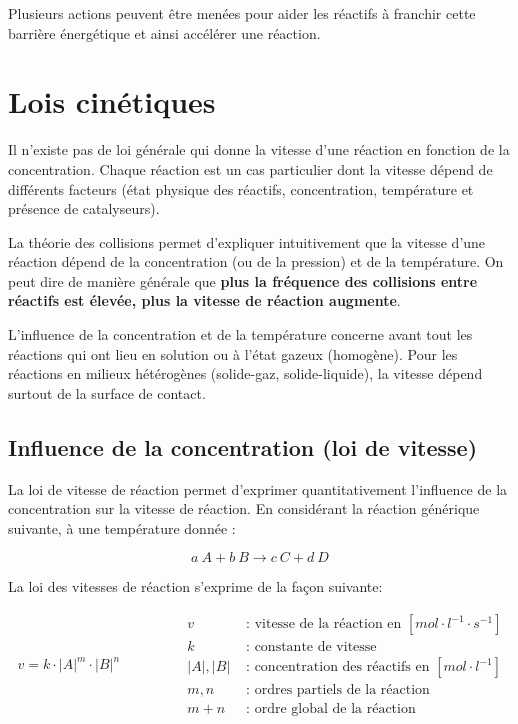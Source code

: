\documentclass[
  11pt,
  a4paper,
  openany]{book}
\begin{document}
Plusieurs actions peuvent être menées pour aider les réactifs à franchir cette barrière énergétique et ainsi accélérer une réaction.

\section{Lois cinétiques}\label{lois-cinuxe9tiques}

Il n'existe pas de loi générale qui donne la vitesse d'une réaction en fonction de la concentration. Chaque réaction est un cas particulier dont la vitesse dépend de différents facteurs (état physique des réactifs, concentration, température et présence de catalyseurs).

La théorie des collisions permet d'expliquer intuitivement que la vitesse d'une réaction dépend de la concentration (ou de la pression) et de la température. On peut dire de manière générale que \textbf{plus la fréquence des collisions entre réactifs est élevée, plus la vitesse de réaction augmente}.

L'influence de la concentration et de la température concerne avant tout les réactions qui ont lieu en solution ou à l'état gazeux (homogène). Pour les réactions en milieux hétérogènes (solide-gaz, solide-liquide), la vitesse dépend surtout de la surface de contact.

\subsection{Influence de la concentration (loi de vitesse)}\label{influence-de-la-concentration-loi-de-vitesse}

La loi de vitesse de réaction permet d'exprimer quantitativement l'influence de la concentration sur la vitesse de réaction. En considérant la réaction générique suivante, à une température donnée :

\[
a\ A + b\ B \rightarrow c\ C + d\ D
\]

La loi des vitesses de réaction s'exprime de la façon suivante:

\[
\begin{split}
v = k \cdot |A|^m \cdot |B|^n
\end{split}
\qquad\qquad
\begin{split}
v &\text{ : vitesse de la réaction en } [mol \cdot l^{-1} \cdot s^{-1}] \\
k &\text{ : constante de vitesse} \\
|A|, |B| &\text{ : concentration des réactifs en } [mol \cdot l^{-1}] \\
m, n &\text{ : ordres partiels de la réaction} \\
m+n &\text{ : ordre global de la réaction}
\end{split}
\]
\end{document}
